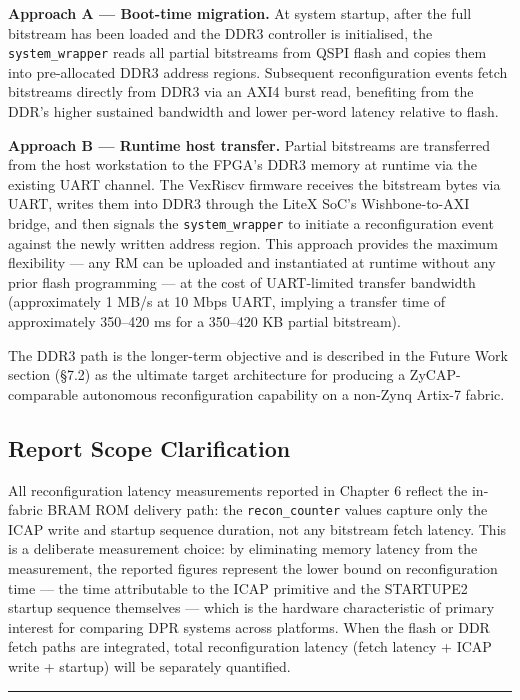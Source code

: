 \textbf{Approach A — Boot-time migration.} At system startup, after the full bitstream has been loaded and the DDR3 controller is initialised, the \texttt{system\_wrapper} reads all partial bitstreams from QSPI flash and copies them into pre-allocated DDR3 address regions. Subsequent reconfiguration events fetch bitstreams directly from DDR3 via an AXI4 burst read, benefiting from the DDR's higher sustained bandwidth and lower per-word latency relative to flash.

\textbf{Approach B — Runtime host transfer.} Partial bitstreams are transferred from the host workstation to the FPGA's DDR3 memory at runtime via the existing UART channel. The VexRiscv firmware receives the bitstream bytes via UART, writes them into DDR3 through the LiteX SoC's Wishbone-to-AXI bridge, and then signals the \texttt{system\_wrapper} to initiate a reconfiguration event against the newly written address region. This approach provides the maximum flexibility — any RM can be uploaded and instantiated at runtime without any prior flash programming — at the cost of UART-limited transfer bandwidth (approximately 1 MB/s at 10 Mbps UART, implying a transfer time of approximately 350–420 ms for a 350–420 KB partial bitstream).

The DDR3 path is the longer-term objective and is described in the Future Work section (§7.2) as the ultimate target architecture for producing a ZyCAP-comparable autonomous reconfiguration capability on a non-Zynq Artix-7 fabric.

\subsection{Report Scope Clarification}

All reconfiguration latency measurements reported in Chapter 6 reflect the in-fabric BRAM ROM delivery path: the \texttt{recon\_counter} values capture only the ICAP write and startup sequence duration, not any bitstream fetch latency. This is a deliberate measurement choice: by eliminating memory latency from the measurement, the reported figures represent the lower bound on reconfiguration time — the time attributable to the ICAP primitive and the STARTUPE2 startup sequence themselves — which is the hardware characteristic of primary interest for comparing DPR systems across platforms. When the flash or DDR fetch paths are integrated, total reconfiguration latency (fetch latency + ICAP write + startup) will be separately quantified.

\vspace{0.4em}\hrule\vspace{0.4em}
